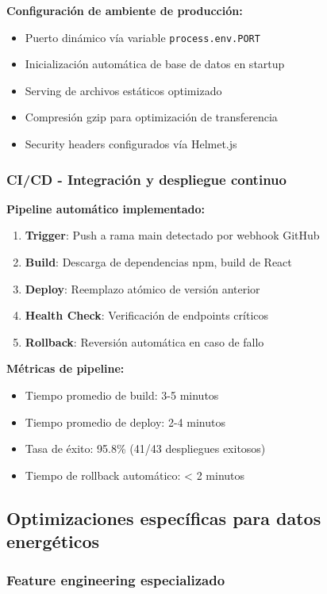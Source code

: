 \textbf{Configuración de ambiente de producción:}
\begin{itemize}
    \item Puerto dinámico vía variable \texttt{process.env.PORT}
    \item Inicialización automática de base de datos en startup
    \item Serving de archivos estáticos optimizado
    \item Compresión gzip para optimización de transferencia
    \item Security headers configurados vía Helmet.js
\end{itemize}

\subsubsection{CI/CD - Integración y despliegue continuo}

\textbf{Pipeline automático implementado:}
\begin{enumerate}
    \item \textbf{Trigger}: Push a rama main detectado por webhook GitHub
    \item \textbf{Build}: Descarga de dependencias npm, build de React
    \item \textbf{Deploy}: Reemplazo atómico de versión anterior
    \item \textbf{Health Check}: Verificación de endpoints críticos
    \item \textbf{Rollback}: Reversión automática en caso de fallo
\end{enumerate}

\textbf{Métricas de pipeline:}
\begin{itemize}
    \item Tiempo promedio de build: 3-5 minutos
    \item Tiempo promedio de deploy: 2-4 minutos
    \item Tasa de éxito: 95.8\% (41/43 despliegues exitosos)
    \item Tiempo de rollback automático: < 2 minutos
\end{itemize}

\subsection{Optimizaciones específicas para datos energéticos}

\subsubsection{Feature engineering especializado}

